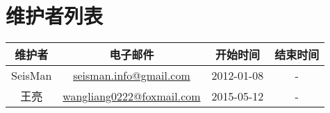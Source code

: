 {\section*{维护者列表}}

\begin{table}[H]
\centering
\begin{tabular}{cccc}
\toprule
维护者      & 电子邮件                               &   开始时间    &   结束时间    \\
\midrule
SeisMan     & \small{\url{seisman.info@gmail.com}}   &  2012-01-08   &   -           \\
王亮     & \small{\url{wangliang0222@foxmail.com}}   &  2015-05-12   &   -           \\
\bottomrule
\end{tabular}
\end{table}
